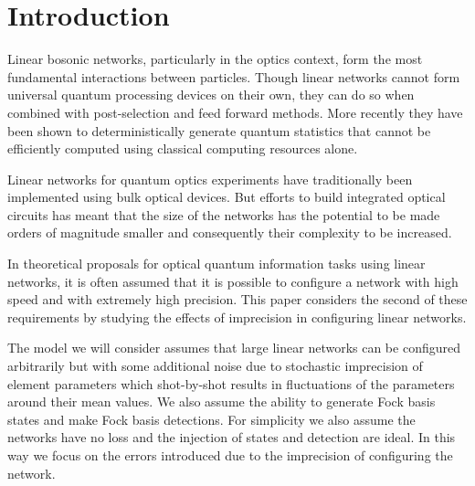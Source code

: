 \documentclass[aps,pra,twocolumn,superscriptaddress,numerical,floatfix]{revtex4-1}
\begin{document}
\pacs{}

\maketitle

\section{Introduction \label{intro}}

Linear bosonic networks, particularly in the optics context, form the most fundamental interactions between particles.  Though linear networks cannot form universal quantum processing devices on their own, they can do so when combined with post-selection and feed forward methods. More recently they have been shown to deterministically generate quantum statistics that cannot be efficiently computed using classical computing resources alone.

Linear networks for quantum optics experiments have traditionally been
implemented using bulk optical devices.  But efforts to build integrated
optical circuits has meant that the size of the networks has the potential to
be made orders of magnitude smaller and consequently their complexity to be increased. 

In theoretical proposals for optical quantum information tasks using linear networks, it is often assumed that it is possible to configure a network with high speed and with extremely high precision.  This paper considers the second of these requirements by studying the effects of imprecision in configuring linear networks.

The model we will consider assumes that large linear networks can be configured arbitrarily but with some additional noise due to stochastic imprecision of element parameters which shot-by-shot results in fluctuations of the parameters around their mean values.  We also assume the ability to generate Fock basis states and make Fock basis detections. For simplicity we also assume the networks have no loss and the injection of states and detection are ideal.  In this way we focus on the errors introduced due to the imprecision of configuring the network.
\end{document}
